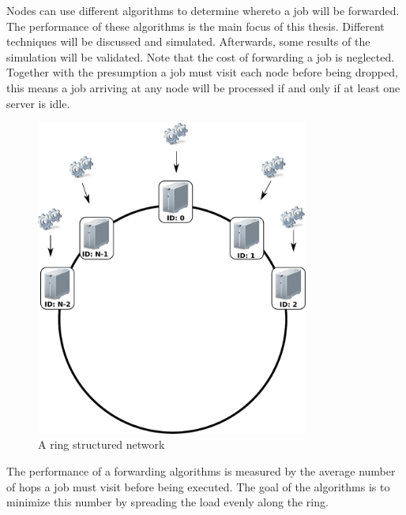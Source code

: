 \documentclass[10pt,a4paper]{article}
\begin{document}
Nodes can use different algorithms to determine whereto a job will be forwarded. The performance of these algorithms is the main focus of this thesis. Different techniques will be discussed and simulated. Afterwards, some results of the simulation will be validated.
Note that the cost of forwarding a job is neglected. Together with the presumption a job must visit each node before being dropped, this means a job arriving at any node will be processed if and only if at least one server is idle.

\begin{figure}[h!tb]
\centering
\includegraphics[width=0.8\textwidth,clip=true,trim=0px 225px 0px 0px]{resources/drawing.pdf}
\caption{A ring structured network}
\label{figring}
\end{figure}

The performance of a forwarding algorithms is measured by the average number of hops a job must visit before being executed. The goal of the algorithms is to minimize this number by spreading the load evenly along the ring. 


%
\end{document}
